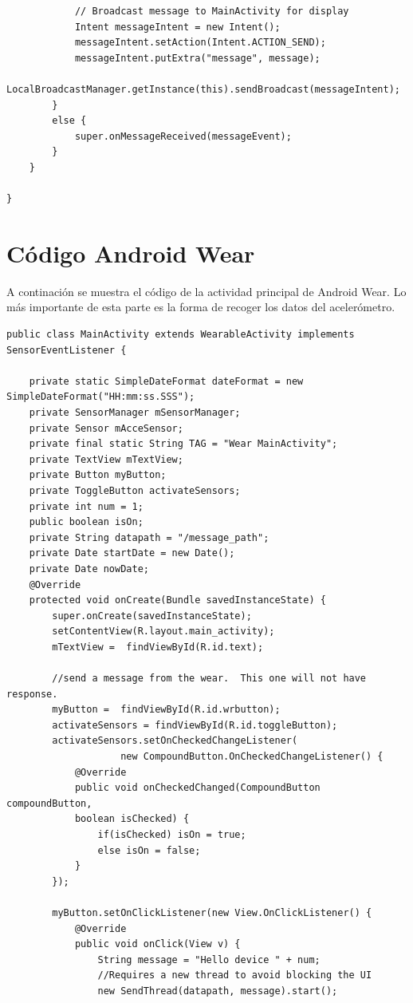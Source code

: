 \documentclass[12pt]{book}
\numberwithin{equation}{section}
\begin{document}
\begin{appendices}
\begin{verbatim}
            // Broadcast message to MainActivity for display
            Intent messageIntent = new Intent();
            messageIntent.setAction(Intent.ACTION_SEND);
            messageIntent.putExtra("message", message);
            LocalBroadcastManager.getInstance(this).sendBroadcast(messageIntent);
        }
        else {
            super.onMessageReceived(messageEvent);
        }
    }

}

\end{verbatim}


\section{Código Android Wear}

A continación se muestra el código de la actividad principal de Android Wear. Lo más importante de esta parte es la forma de recoger los datos del acelerómetro.
\begin{verbatim}
public class MainActivity extends WearableActivity implements SensorEventListener {

    private static SimpleDateFormat dateFormat = new SimpleDateFormat("HH:mm:ss.SSS");
    private SensorManager mSensorManager;
    private Sensor mAcceSensor;
    private final static String TAG = "Wear MainActivity";
    private TextView mTextView;
    private Button myButton;
    private ToggleButton activateSensors;
    private int num = 1;
    public boolean isOn;
    private String datapath = "/message_path";
    private Date startDate = new Date();
    private Date nowDate;
    @Override
    protected void onCreate(Bundle savedInstanceState) {
        super.onCreate(savedInstanceState);
        setContentView(R.layout.main_activity);
        mTextView =  findViewById(R.id.text);

        //send a message from the wear.  This one will not have response.
        myButton =  findViewById(R.id.wrbutton);
        activateSensors = findViewById(R.id.toggleButton);
        activateSensors.setOnCheckedChangeListener(
        			new CompoundButton.OnCheckedChangeListener() {
            @Override
            public void onCheckedChanged(CompoundButton compoundButton, 
            boolean isChecked) {
                if(isChecked) isOn = true;
                else isOn = false;
            }
        });

        myButton.setOnClickListener(new View.OnClickListener() {
            @Override
            public void onClick(View v) {
                String message = "Hello device " + num;
                //Requires a new thread to avoid blocking the UI
                new SendThread(datapath, message).start();


\end{verbatim}
\end{appendices}
\end{document}
